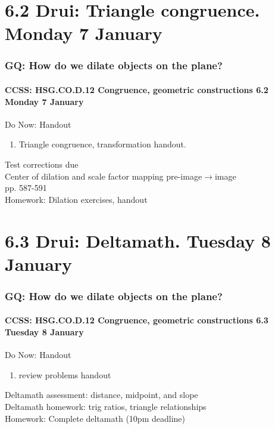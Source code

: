 \documentclass{beamer}
\begin{document}
\section{6.2 Drui: Triangle congruence. Monday 7 January}
  \frame
  {
    \frametitle{GQ: How do we dilate objects on the plane?}
    \framesubtitle{CCSS: HSG.CO.D.12 Congruence, geometric constructions  \alert{6.2 Monday 7 January}}

    \begin{block}{Do Now: Handout}
      \begin{enumerate}
        \item Triangle congruence, transformation handout.
      \end{enumerate}
    \end{block}
    Test corrections due\\
    Center of dilation and scale factor mapping pre-image$\rightarrow$image\\
    pp. 587-591\\[0.5cm] %
    Homework: Dilation exercises, handout\\
  }

\section{6.3 Drui: Deltamath. Tuesday 8 January}
  \frame
  {
    \frametitle{GQ: How do we dilate objects on the plane?}
    \framesubtitle{CCSS: HSG.CO.D.12 Congruence, geometric constructions  \alert{6.3 Tuesday 8 January}}

    \begin{block}{Do Now: Handout}
      \begin{enumerate}
        \item review problems handout
      \end{enumerate}
    \end{block}
    Deltamath assessment: distance, midpoint, and slope\\
    Deltamath homework: trig ratios, triangle relationships\\[0.5cm]
    Homework: Complete deltamath (10pm deadline)
  }
\end{document}
